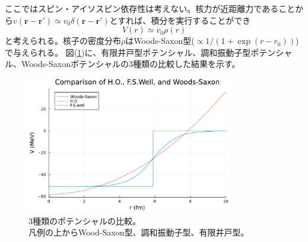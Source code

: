 \documentclass[a4paper]{jsreport}
\begin{document}
  ここではスピン・アイソスピン依存性は考えない。核力が近距離力であることから\(v(\bm{r}-\bm{r}')\simeq v_0\delta(\bm{r}-\bm{r}')\)とすれば、積分を実行することができ
  \begin{equation}
    V(r)\simeq v_0\rho(r)
  \end{equation}
  と考えられる。核子の密度分布\(\rho\)はWoods-Saxon型(\(\propto 1/(1+\exp(r-r_0))\))で与えられる。
  図(\ref{potential})に、有限井戸型ポテンシャル、調和振動子型ポテンシャル、Woods-Saxonポテンシャルの3種類の比較した結果を示す。
  \begin{figure}[H]
    \centering
    \includegraphics[width=0.8\textwidth]{main_fig/Comp_pt.pdf}
    \caption{3種類のポテンシャルの比較。\\
    凡例の上からWood-Saxon型、調和振動子型、有限井戸型。}
    \label{potential}
  \end{figure}
\end{document}
